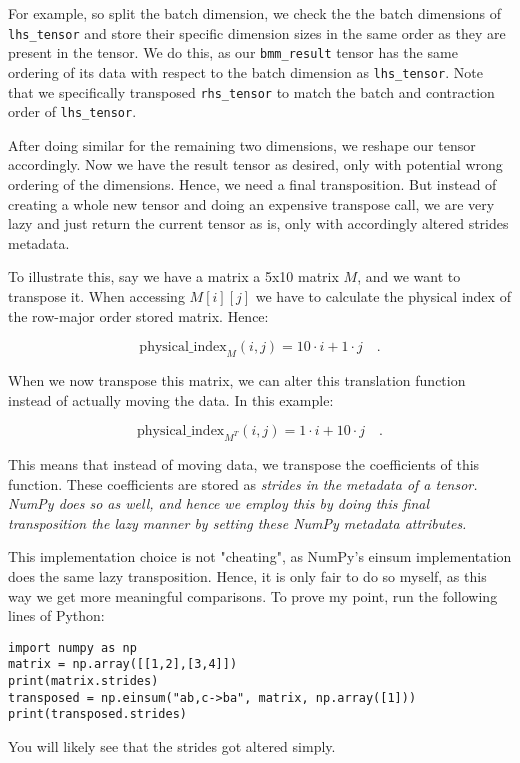 \documentclass[sigconf]{acmart}
\begin{document}
For example, so split the batch dimension, we check the the batch dimensions of \texttt{lhs\_tensor} and store their specific dimension sizes in the same order as they are present in the tensor. We do this, as our \texttt{bmm\_result} tensor has the same ordering of its data with respect to the batch dimension as \texttt{lhs\_tensor}. Note that we specifically transposed \texttt{rhs\_tensor} to match the batch and contraction order of \texttt{lhs\_tensor}.

After doing similar for the remaining two dimensions, we reshape our tensor accordingly. Now we have the result tensor as desired, only with potential wrong ordering of the dimensions. Hence, we need a final transposition. But instead of creating a whole new tensor and doing an expensive transpose call, we are very lazy and just return the current tensor as is, only with accordingly altered strides metadata.

To illustrate this, say we have a matrix a 5x10 matrix $M$, and we want to transpose it. When accessing $M[i][j]$ we have to calculate the physical index of the row-major order stored matrix. Hence:

\[ \text{physical\_index}_M(i, j) = 10 \cdot i + 1 \cdot j \quad . \]

When we now transpose this matrix, we can alter this translation function instead of actually moving the data. In this example:

\[ \text{physical\_index}_{M^T}(i, j) = 1 \cdot i + 10 \cdot j \quad . \]

This means that instead of moving data, we transpose the coefficients of this function. These coefficients are stored as \em strides \em in the metadata of a tensor. NumPy does so as well, and hence we employ this by doing this final transposition the lazy manner by setting these NumPy metadata attributes.

This implementation choice is not "cheating", as NumPy's einsum implementation does the same lazy transposition. Hence, it is only fair to do so myself, as this way we get more meaningful comparisons. To prove my point, run the following lines of Python:

\begin{verbatim}
import numpy as np
matrix = np.array([[1,2],[3,4]])
print(matrix.strides)
transposed = np.einsum("ab,c->ba", matrix, np.array([1]))
print(transposed.strides)
\end{verbatim}

You will likely see that the strides got altered simply.
\end{document}
